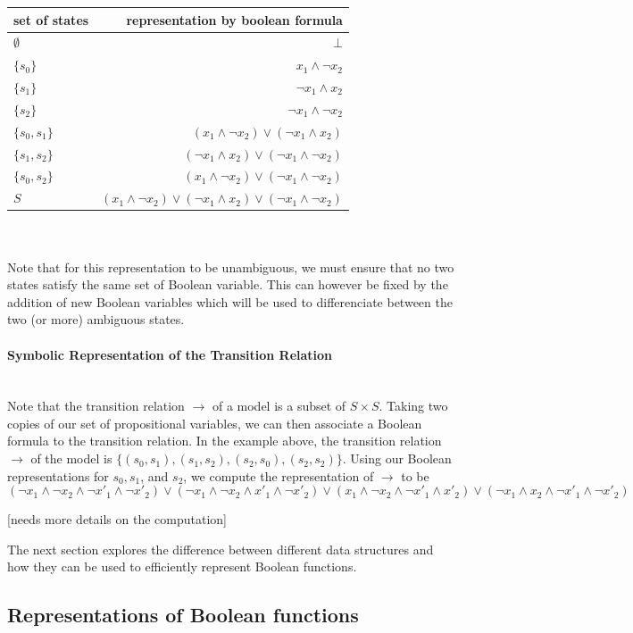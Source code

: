 \documentclass{article}
\newcommand{\myparagraph}[1]{\paragraph{#1}\mbox{}\\}
\begin{document}
\begin{tabular}{ l | r }
  set of states & representation by boolean formula \\ \hline
$\emptyset $&   $\bot$ \\
$\{ s_0\}$ & $x_1 \land \lnot x_2 $\\
$\{ s_1\}$ & $ \lnot x_1 \land x_2 $\\
$\{ s_2\}$ & $\lnot x_1 \land \lnot x_2 $\\
$\{ s_0, s_ 1\}$ & $(x_1 \land \lnot x_2) \lor (\lnot x_1 \land x_2)  $\\
$\{ s_1, s_2\}$ & $(\lnot x_1 \land  x_2) \lor (\lnot x_1 \land\lnot x_2)$\\
$\{ s_0, s_2\}$ & $(x_1 \land \lnot x_2) \lor (\lnot x_1 \land\lnot x_2) $\\
$S$ & $(x_1 \land \lnot x_2) \lor (\lnot x_1 \land  x_2) \lor (\lnot x_1 \land\lnot x_2)$
\end{tabular}
\\
\\

Note that for this representation to be unambiguous, we must ensure that no two states satisfy the same set of Boolean variable. This can however be fixed by the addition of new Boolean variables which will be used to differenciate between the two (or more) ambiguous states.

\myparagraph{Symbolic Representation of the Transition Relation}

Note that the transition relation $\rightarrow$ of a model is a subset of $S \times S$. Taking two copies of our set of propositional variables, we can then associate a Boolean formula to the transition relation. In the example above, the transition relation $\rightarrow$ of the model is $\{(s_0, s_1), (s_1, s_2), (s_2, s_0), (s_2, s_2)\}$. 
Using our Boolean representations for $s_0, s_1$, and $s_2$, we compute the representation of $\rightarrow$ to be $$(\lnot x_1 \land \lnot x_2 \land \lnot x'_1 \land \lnot x'_2 ) \lor (\lnot x_1 \land \lnot x_2 \land x'_1 \land \lnot x'_2 ) \lor ( x_1 \land \lnot x_2 \land \lnot x'_1 \land  x'_2 ) \lor (\lnot x_1 \land x_2 \land \lnot x'_1 \land \lnot x'_2 )$$

[needs more details on the computation]


The next section explores the difference between different data structures and how they can be used to efficiently represent Boolean functions. 

\subsection{Representations of Boolean functions}
\end{document}
